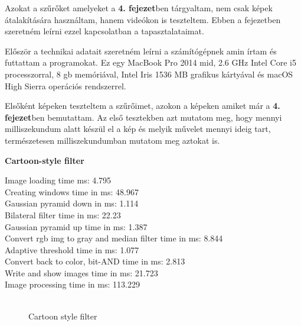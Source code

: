 
\label{chap:tests}

Azokat a szűrőket amelyeket a \textbf{4. fejezet}ben tárgyaltam, nem csak képek átalakítására használtam, hanem videókon is teszteltem. Ebben a fejezetben szeretném leírni ezzel kapcsolatban a tapasztalataimat. 

Először a technikai adatait szeretném leírni a számítógépnek amin írtam és futtattam a programokat. Ez egy MacBook Pro  2014 mid, 2.6 GHz Intel Core i5 processzorral, 8 gb memóriával, Intel Iris 1536 MB grafikus kártyával és macOS High Sierra operációs rendszerrel.


Elsőként képeken teszteltem a szűrőimet, azokon a képeken amiket már a \textbf{4. fejezet}ben bemutattam. Az első tesztekben azt mutatom meg, hogy mennyi milliszekundum alatt készül el a kép és melyik művelet mennyi ideig tart, természetesen milliszekundumban mutatom meg aztokat is.

\textbf{Cartoon-style filter}

Image loading time ms: 4.795\\
Creating windows time in ms: 48.967\\
Gaussian pyramid down in ms: 1.114\\
Bilateral filter time in ms: 22.23\\
Gaussian pyramid up time in ms: 1.387\\
Convert rgb img to gray and median filter  time in ms: 8.844\\
Adaptive threshold time in ms: 1.077\\
Convert back to color, bit-AND time in ms: 2.813\\
Write and show images time in ms: 21.723\\
Image processing time in ms: 113.229\\\\

\begin{figure}
\centering
{}
\caption{Cartoon style filter}
\end{figure}

